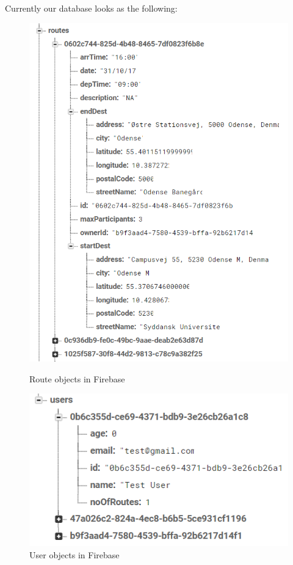 Currently our database looks as the following:
\begin{figure}[H]
    \centering
    \begin{minipage}{.5\textwidth}
        \centering
        \includegraphics[scale=0.7]{Graphics/Images/firebase_routes.PNG}
        \caption{Route objects in Firebase}
        \label{fig:firebase_routes}
    \end{minipage}%
    \begin{minipage}{0.5\textwidth}
        \centering
        \includegraphics[scale=0.7]{Graphics/Images/firebase_users.PNG}
        \caption{User objects in Firebase}
        \label{fig:firebase_users}
    \end{minipage}
\end{figure}

